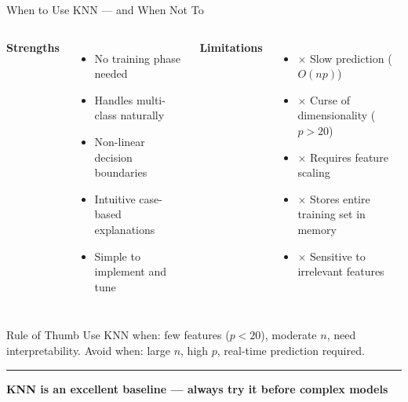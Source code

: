 \documentclass[8pt,aspectratio=169]{beamer}
\newcommand{\bottomnote}[1]{%
\vfill
\vspace{-2mm}
\textcolor{mllavender2}{\rule{\textwidth}{0.4pt}}
\vspace{1mm}
\footnotesize
\textbf{#1}
}
\newenvironment{compactlist}{%
  \begin{itemize}%
    \setlength{\itemsep}{2pt}%
    \setlength{\parskip}{0pt}%
    \setlength{\parsep}{0pt}%
}{%
  \end{itemize}%
}
\begin{document}
\begin{frame}[t]{When to Use KNN --- and When Not To}
\begin{columns}[T]
\small
\textcolor{mlgreen}{\textbf{Strengths}}

\footnotesize
\begin{compactlist}
\item \footnotesize \textcolor{mlgreen}{\checkmark} No training phase needed
\item \footnotesize \textcolor{mlgreen}{\checkmark} Handles multi-class naturally
\item \footnotesize \textcolor{mlgreen}{\checkmark} Non-linear decision boundaries
\item \footnotesize \textcolor{mlgreen}{\checkmark} Intuitive case-based explanations
\item \footnotesize \textcolor{mlgreen}{\checkmark} Simple to implement and tune
\end{compactlist}

\small
\textcolor{mlred}{\textbf{Limitations}}

\footnotesize
\begin{compactlist}
\item \footnotesize \textcolor{mlred}{$\times$} Slow prediction ($O(np)$)
\item \footnotesize \textcolor{mlred}{$\times$} Curse of dimensionality ($p > 20$)
\item \footnotesize \textcolor{mlred}{$\times$} Requires feature scaling
\item \footnotesize \textcolor{mlred}{$\times$} Stores entire training set in memory
\item \footnotesize \textcolor{mlred}{$\times$} Sensitive to irrelevant features
\end{compactlist}
\end{columns}

\vspace{3mm}
\begin{block}{Rule of Thumb}
\footnotesize Use KNN when: few features ($p < 20$), moderate $n$, need interpretability. Avoid when: large $n$, high $p$, real-time prediction required.
\end{block}
\bottomnote{KNN is an excellent baseline --- always try it before complex models}
\end{frame}
\end{document}
